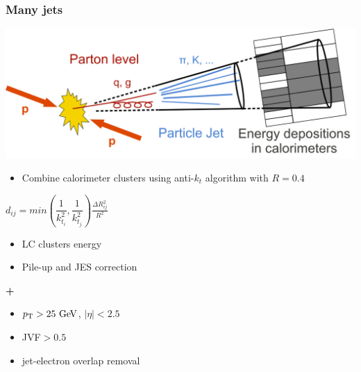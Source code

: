 \begin{frame}\frametitle{Many jets}
\centering\footnotesize

\begin{minipage}{.5\textwidth}\centering

\includegraphics[width=.78\textwidth]{pics/Sketch_PartonParticleCaloJet.png}\\

\begin{itemize}
\item Combine calorimeter clusters using anti-$k_t$ algorithm with $R=0.4$
\end{itemize}
$d_{ij}=min(\dfrac{1}{k_{t_i}^{2}},\dfrac{1}{k_{t_j}^{2}})\frac{\Delta R_{ij}^{2}}{R^{2}}$
\begin{itemize}
\item LC clusters energy
\item Pile-up and JES correction
\end{itemize}
{\cccolor \bfseries +}\\
\begin{itemize}
\item $\pt>25\gev$, $|\eta|<2.5$
\item JVF$>0.5$
\item jet-electron overlap removal
\end{itemize}


\end{minipage}\begin{minipage}{.5\textwidth}\centering


\end{minipage}
\end{frame}
